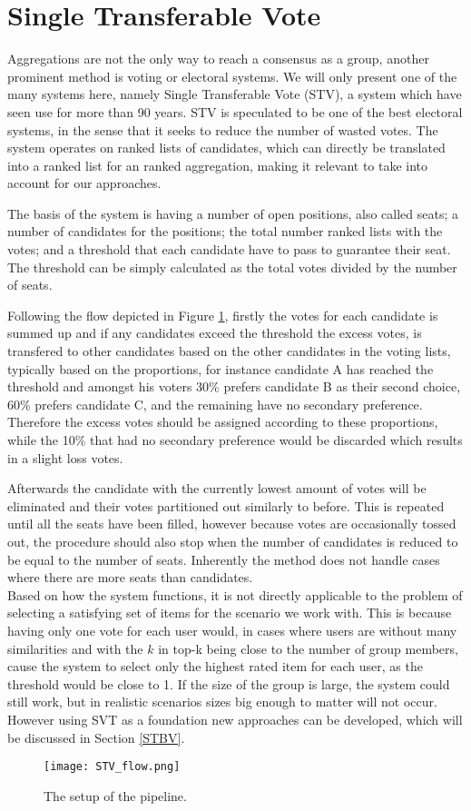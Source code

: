 \section{Single Transferable Vote} \label{sec:stv}
Aggregations are not the only way to reach a consensus as a group, another prominent method is voting or electoral systems. We will only present one of the many systems here, namely Single Transferable Vote (STV), a system which have seen use for more than 90 years. \cite{stvireland}
STV is speculated to be one of the best electoral systems, in the sense that it seeks to reduce the number of wasted votes. The system operates on ranked lists of candidates, which can directly be translated into a ranked list for an ranked aggregation, making it relevant to take into account for our approaches.

The basis of the system is having a number of open positions, also called seats; a number of candidates for the positions; the total number ranked lists with the votes; and a threshold that each candidate have to pass to guarantee their seat. The threshold can be simply calculated as the total votes divided by the number of seats. \cite{stv}

Following the flow depicted in Figure \ref{fig:stvflow}, firstly the votes for each candidate is summed up and if any candidates exceed the threshold the excess votes, is transfered to other candidates based on the other candidates in the voting lists, typically based on the proportions, for instance candidate A has reached the threshold and amongst his voters 30\% prefers candidate B as their second choice, 60\% prefers candidate C, and the remaining have no secondary preference. Therefore the excess votes should be assigned according to these proportions, while the 10\% that had no secondary preference would be discarded which results in a slight loss votes.

Afterwards the candidate with the currently lowest amount of votes will be eliminated and their votes partitioned out similarly to before. This is repeated until all the seats have been filled, however because votes are occasionally tossed out, the procedure should also stop when the number of candidates is reduced to be equal to the number of seats. Inherently the method does not handle cases where there are more seats than candidates.\\

Based on how the system functions, it is not directly applicable to the problem of selecting a satisfying set of items for the scenario we work with. This is because having only one vote for each user would, in cases where users are without many similarities and with the $k$ in top-k being close to the number of group members, cause the system to select only the highest rated item for each user, as the threshold would be close to 1. If the size of the group is large, the system could still work, but in realistic scenarios sizes big enough to matter will not occur. However using SVT as a foundation new approaches can be developed, which will be discussed in Section \ref{STBV}.

\begin{figure}
	\centering
	\texttt{[image: STV\_flow.png]}
	\caption{The setup of the pipeline.}
	\label{fig:stvflow}
\end{figure}
